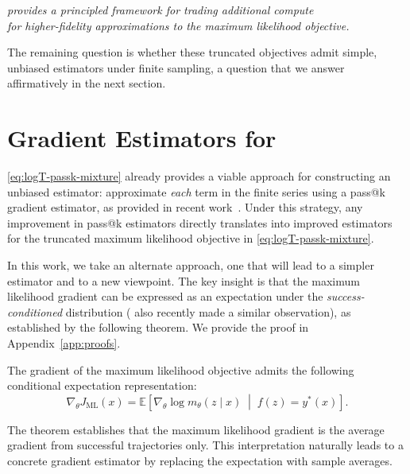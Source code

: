 \documentclass[10pt]{article} %
\begin{document}
\vspace{1em}
\begin{center}
\emph{\ours{} provides a principled framework for trading
additional compute \\ for higher-fidelity approximations to the maximum likelihood
objective.}
\end{center}
\vspace{1em}
 

The remaining question is whether these truncated objectives admit simple,
unbiased estimators under finite sampling, a question that we answer affirmatively in the next section.

\section{Gradient Estimators for \ours{}}
\label{sec:estimators}

\cref{eq:logT-passk-mixture} already provides a viable approach for
constructing an unbiased estimator: approximate \emph{each} term in the finite
series using a pass@k gradient estimator, as provided in recent  work~\citep{walder2025passkpolicyoptimizationsolving,chen2025passktrainingadaptivelybalancing}. %
Under this strategy, any improvement in pass@k
estimators directly translates into improved estimators for the truncated maximum
likelihood objective in \cref{eq:logT-passk-mixture}. 

In this work, we take an alternate approach, one that will lead to a simpler estimator and to a new viewpoint. 
The key insight is that the maximum likelihood gradient can be expressed as an 
expectation under the \emph{success-conditioned} distribution (\citet{davis2025objectivereasoningreinforcementlearning} also recently made a similar observation), as established by the following theorem. We provide the proof in Appendix~\ref{app:proofs}.

\begin{theorem}
\label{prop:ml-conditional}
The gradient of the maximum likelihood objective admits the following conditional
expectation representation:
\begin{equation}
\label{eqn:cond-grad}
\nabla_\theta J_{\mathrm{ML}}(x)
=
\mathbb{E}\!\left[
\nabla_\theta \log m_\theta(z \mid x)
\;\middle|\;
f(z)=y^\ast(x)
\right].
\end{equation}
\end{theorem}
The theorem establishes that the maximum likelihood gradient is the average gradient from successful trajectories only. 
This interpretation naturally leads to a concrete gradient estimator by replacing the expectation with sample averages.
\end{document}
